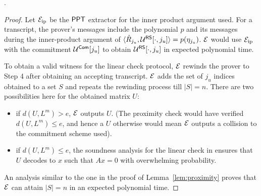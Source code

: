 .
\begin{proof}
Let $\mathcal{E}_{\mathrm{ip}}$ be the $\mathsf{PPT}$ extractor for the inner product argument used. For a transcript, the prover's messages include the polynomial $p$ and its messages during the inner-product argument of $\langle \hat{R}_{j_u},\mathcal{U}^{\mathsf{RS}}[\cdot,j_u]\rangle = p(\eta_{j_u})$.
$\mathcal{E}$ would use $\mathcal{E}_{\mathrm{ip}}$ with the commitment $\mathcal{U}^{\mathsf{Com}}[j_u]$ to obtain $\mathcal{U}^{\mathsf{RS}}[\cdot,j_u]$ in expected polynomial time. 

To obtain a valid witness for the linear check protocol, $\mathcal{E}$ rewinds the prover to Step 4 after obtaining an accepting transcript. $\mathcal{E}$ adds the set of $j_u$ indices obtained to a set $S$ and repeats the rewinding process till $|S| = n$. 
There are two possibilities here for the obtained matrix $U$:
\begin{itemize}
\item if $d(U, L^m) > e$, $\mathcal{E}$ outputs $U$. (The proximity check would have verified $d(U,L^m) \leq e$, and hence a $U$ otherwise would mean $\mathcal{E}$ outputs a collision to the commitment scheme used).
\item if $d(U, L^m) \leq e$, the soundness analysis for the linear check in \cite{Ligero} ensures that $U$ decodes to $x$ such that $Ax=0$ with overwhelming probability. %
\end{itemize}
An analysis similar to the one in the proof of Lemma~\ref{lem:proximity} proves that $\mathcal{E}$ can attain $|S| = n$ in an expected polynomial time.


\end{proof}
